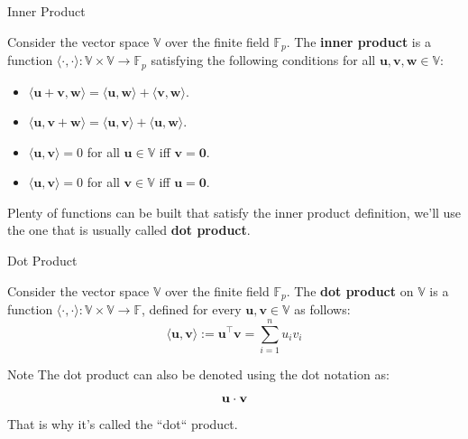 \documentclass{zkdl-presentation-template}
\begin{document}
    \begin{frame}{Inner Product}
        \begin{definition}
            Consider the vector space $\mathbb{V}$ over the finite field $\mathbb{F}_p$. The 
            \textbf{inner product} is a function 
            $\langle \cdot, \cdot \rangle: \mathbb{V} \times \mathbb{V} \to \mathbb{F}_p$ satisfying 
            the following conditions for all $\mathbf{u},\mathbf{v},\mathbf{w} \in \mathbb{V}$:
            \begin{itemize}
                \item $\langle \mathbf{u} + \mathbf{v}, \mathbf{w} \rangle = \langle \mathbf{u}, \mathbf{w} \rangle + \langle \mathbf{v}, \mathbf{w} \rangle$.
                \item $\langle \mathbf{u}, \mathbf{v} + \mathbf{w} \rangle = \langle \mathbf{u}, \mathbf{v} \rangle + \langle \mathbf{u}, \mathbf{w} \rangle$.
                \item $\langle \mathbf{u}, \mathbf{v} \rangle = 0$ for all $\mathbf{u} \in \mathbb{V}$ iff $\mathbf{v} = \mathbf{0}$.
                \item $\langle \mathbf{u}, \mathbf{v} \rangle = 0$ for all $\mathbf{v} \in \mathbb{V}$ iff $\mathbf{u} = \mathbf{0}$.
            \end{itemize}
        \end{definition}   

        Plenty of functions can be built that satisfy the inner product definition, we'll use the one
        that is usually called \textbf{dot product}.
    \end{frame}

    \begin{frame}{Dot Product}
        \begin{definition}
            Consider the vector space $\mathbb{V}$ over the finite field $\mathbb{F}_p$. The 
            \textbf{dot product} on $\mathbb{V}$ is a function 
            $\langle \cdot, \cdot \rangle: \mathbb{V} \times \mathbb{V} \rightarrow \mathbb{F}$, 
            defined for every $\mathbf{u}, \mathbf{v} \in \mathbb{V}$ as follows:
            \begin{equation*}
                \langle \mathbf{u}, \mathbf{v} \rangle := \mathbf{u}^{\top}\mathbf{v} = \sum_{i=1}^{n} u_i v_i
            \end{equation*}
        \end{definition}

        \pause
        \begin{block}{Note}                 
            The dot product can also be denoted using the dot notation as:
            \vspace{-8pt}
            \begin{equation*}
                \mathbf{u} \cdot \mathbf{v}
                \vspace{-8pt}
            \end{equation*}
            That is why it's called the ``dot`` product.
        \end{block}
    \end{frame}
\end{document}
